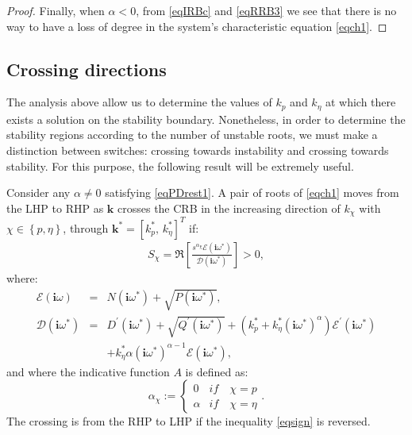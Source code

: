 \documentclass[twoside,reqno,11pt]{fcaa-var} %
\begin{document}
\begin{proof}
	Finally, when $\alpha<0$, from \eqref{eqIRBc} and \eqref{eqRRB3} we see that there is no way to have a loss of degree in the system's characteristic equation \eqref{eqch1}.
\end{proof}
\subsection{Crossing directions}
The analysis above allow us to determine the values of $k_p$ and $k_\eta$ at which there exists a solution on the stability boundary. Nonetheless, in order to determine the stability regions according to the number of unstable roots, we must make a distinction between switches: crossing towards instability and crossing towards stability. %
For this purpose, the following result will be extremely useful.
\begin{proposition}\label{prop:cross}
	Consider any $\alpha\neq0$ satisfying \eqref{eqPDrest1}. A pair of roots of \eqref{eqch1} moves from the LHP to RHP as $\bm{k}$ crosses the CRB in the increasing direction of $k_\chi$ with $\chi\in\left\{p,\eta\right\}$, through $\bm{k}^{\ast}=[k_p^{\ast},\,k_\eta^{\ast}]^T$ if:
	\begin{eqnarray}
	S_\chi=\Re\left[\tfrac{s^{\alpha_\chi} \mathcal{E}(\bm{i}\omega^{\ast})}{\mathcal{D}(\bm{i}\omega^{\ast})}\right]>0, \label{eqsign}
	\end{eqnarray}
	where:
	\begin{eqnarray}
	\mathcal{E}(\bm{i}\omega)\!\!\!\!\!\!\!\!&=&\!\!\!\!\!\!\!\!N(\bm{i}\omega^{\ast})+\sqrt{P(\bm{i}\omega^{\ast})}, \\
	\mathcal{D}(\bm{i}\omega^{\ast})\!\!\!\!\!\!\!\!&=&\!\!\!\!\!\!\!\!D^\prime(\bm{i}\omega^{\ast})\!+\!\sqrt{Q^\prime(\bm{i}\omega^{\ast})}\!+\!(k_p^{\ast}+k_\eta^{\ast}(\bm{i}\omega^{\ast})^\alpha)\mathcal{E}^\prime(\bm{i}\omega^{\ast}) \nonumber\\
	& &+k_\eta^{\ast}\alpha(\bm{i}\omega^{\ast})^{\alpha-1}\mathcal{E}(\bm{i}\omega^{\ast}), \label{eqsignden}
	\end{eqnarray}
	and where the indicative function $A$ is defined as:
	\begin{equation}
	\alpha_\chi:=\begin{cases}0 & if \quad \chi=p \\
	\alpha  & if \quad  \chi=\eta \end{cases}.\label{Aexp}
	\end{equation}
	The crossing is from the RHP to LHP if the inequality \eqref{eqsign} is reversed.
\end{proposition} 
\end{document}
